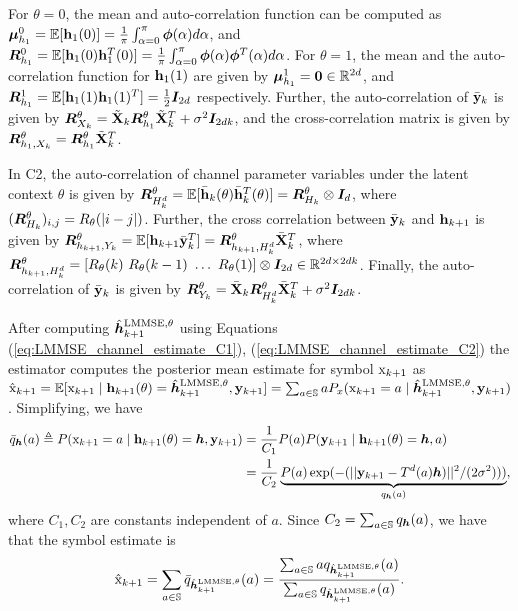 \documentclass[journal,letterpaper,onecolumn]{IEEEtran}
\begin{document}
For $\theta = 0$, the mean and auto-correlation function can be computed as $\boldsymbol{\mu}_{h_1}^0 = \mathbb{E}[{\mathbf{h}}_1(0)] = \frac{1}{\pi} \int_{\alpha = 0}^\pi \boldsymbol{\phi}(\alpha) d\alpha$, and ${\bm{R}}^0_{h_1} = \mathbb{E}[{\mathbf{h}}_1(0){\mathbf{h}}_1^T(0)] =  \frac{1}{\pi} \int_{\alpha = 0}^\pi \boldsymbol{\phi}(\alpha) \boldsymbol{\phi}^T(\alpha) d\alpha$. For $\theta=1$, the mean and the auto-correlation function for ${\mathbf{h}}_1(1)$ are given by $\boldsymbol{\mu}^1_{h_1} = \mathbf{0} \in {\mathbb{R}}^{2d}$, and ${\bm{R}}^1_{h_1} = \mathbb{E}[{\mathbf{h}}_1(1){\mathbf{h}}_1(1)^T] = \frac{1}{2}{\bm{I}}_{2d}$ respectively. Further, the auto-correlation of $\bar{{\mathbf{y}}}_k$ is given by ${\bm{R}}^\theta_{X_k} = \tilde{{\mathbf{X}}}_k {\bm{R}}_{h_1}^\theta \tilde{{\mathbf{X}}}_k^T + \sigma^2{\bm{I}}_{2dk}$, and the cross-correlation matrix is given by ${\bm{R}}_{h_1, X_k}^\theta = {\bm{R}}_{h_1}^\theta \tilde{{\mathbf{X}}}_k^T$.

In C2, the auto-correlation of channel parameter variables under the latent context $\theta$ is given by ${\bm{R}}^\theta_{H_k^d} = \mathbb{E}[\bar{{\mathbf{h}}}_k(\theta) \bar{{\mathbf{h}}}_k^T(\theta)] 
= {\bm{R}}_{H_k}^\theta \otimes {\bm{I}}_d$, where $({\bm{R}}_{H_k}^\theta)_{i,j} = R_\theta(|i-j|)$.  Further, the cross correlation between $\bar{{\mathbf{y}}}_k$ and ${\mathbf{h}}_{k+1}$ is given by
${\bm{R}}_{h_{k+1}, Y_k}^\theta = \mathbb{E}[{\mathbf{h}}_{k+1} \bar{{\mathbf{y}}}_{k}^T] = {\bm{R}}_{h_{k+1}, H^d_k}^\theta \bar{{\mathbf{X}}}_k^T$, where ${\bm{R}}^\theta_{h_{k+1}, H_k^d} = [R_\theta(k)~R_{\theta}(k-1)~\dots~R_\theta(1)]\otimes {\bm{I}}_{2d} \in{\mathbb{R}}^{2d \times 2dk}$. Finally, the auto-correlation of $\bar{{\mathbf{y}}}_{k}$ is given by ${\bm{R}}^\theta_{Y_k} = \bar{{\mathbf{X}}}_k {\bm{R}}^\theta_{H_k^d} \bar{{\mathbf{X}}}_k^T + \sigma^2 {\bm{I}}_{2dk}$.

After computing $\hat{{\bm{h}}}_{k+1}^{\rm LMMSE, \theta}$ using Equations (\ref{eq:LMMSE_channel_estimate_C1}), (\ref{eq:LMMSE_channel_estimate_C2}) the estimator computes the posterior mean estimate for symbol ${\textnormal{x}}_{k+1}$ as $\hat{{\textnormal{x}}}_{k+1} = \mathbb{E}[{\textnormal{x}}_{k+1} \mid {\mathbf{h}}_{k+1}(\theta) = \hat{{\bm{h}}}_{k+1}^{\rm LMMSE, \theta}, {\mathbf{y}}_{k+1}] = \sum_{a \in {\mathbb{S}}} a P_x({\textnormal{x}}_{k+1} = a \mid  \hat{{\bm{h}}}_{k+1}^{\rm LMMSE, \theta},{\mathbf{y}}_{k+1} )$. Simplifying, we have
\begin{align*}   
 \bar{q}_{\bm{h}}(a) \triangleq P({\textnormal{x}}_{k+1} = a \mid {\mathbf{h}}_{k+1}(\theta) = {\bm{h}}, {\mathbf{y}}_{k+1}) &= \frac{1}{C_1} P(a)  P({\mathbf{y}}_{k+1} \mid {\mathbf{h}}_{k+1}(\theta) = {\bm{h}}, a) \\
    &= \frac{1}{C_2} \underbrace{P(a)\exp(-(||{\mathbf{y}}_{k+1} - T^d(a){\bm{h}})||^2/(2\sigma^2)))}_{q_{\bm{h}}(a)},
\end{align*}
where $C_1, C_2$ are constants independent of $a$. Since $C_2 = \sum_{a\in{\mathbb{S}}} q_{{\bm{h}}}(a)$, we have that the symbol estimate is
\begin{equation}
    \label{eq:symbol_estimate}
    \hat{{\textnormal{x}}}_{k+1} = \sum_{a\in {\mathbb{S}}} \bar{q}_{\hat{{\bm{h}}}_{k+1}^{\rm LMMSE, \theta}}(a) = \frac{\sum_{a \in {\mathbb{S}}} a q_{\hat{{\bm{h}}}_{k+1}^{\rm LMMSE, \theta}}(a)}{\sum_{a \in{\mathbb{S}}} q_{\hat{{\bm{h}}}_{k+1}^{\rm LMMSE, \theta}}(a)}.
\end{equation}
\end{document}
